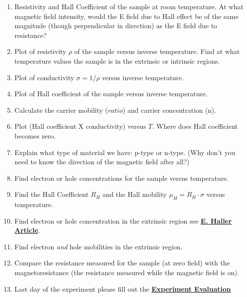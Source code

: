 \documentclass{../lab}
\begin{document}
\begin{enumerate}

    \item Resistivity and Hall Coefficient of the sample at room temperature. At what magnetic field intensity, would the E field due to Hall effect be of the same magnitude (though perpendicular in direction) as the E field due to resistance?

    \item Plot of resistivity $\rho$ of the sample versus inverse temperature. Find at what temperature values the sample is in the extrinsic or intrinsic regions.

    \item Plot of conductivity $\sigma = 1/\rho$ versus inverse temperature.

    \item Plot of Hall coefficient of the sample versus inverse temperature.

    \item Calculate the carrier mobility ($ratio$) and carrier concentration (n).

    \item Plot (Hall coefficient X conductivity) versus $T$. Where does Hall coefficient becomes zero.

    \item Explain what type of material we have: p-type or n-type. (Why don't you need to know the direction of the magnetic field after all?)

    \item Find electron or hole concentrations for the sample versus temperature.\\
    
    \item Find the Hall Coefficient $ R_H $ and the Hall mobility $\mu_H = R_H \cdot \sigma$ versus temperature.

    \item Find electron or hole concentration in the extrinsic region see \href{https://drive.google.com/file/d/1aaxKBCAtrejprBYuUYWViohH6TsHiIo8/view?usp=drive_link}{\textbf{E. Haller Article}}.

    \item Find electron \emph{and} hole mobilities in the extrinsic region.

    \item Compare the resistance measured for the sample (at zero field) with the magnetoresistance (the resistance measured while the magnetic field is on).

    \item Last day of the experiment please fill out the \href{\ExperimentEvaluation}{\textbf{Experiment Evaluation}}

\end{enumerate}
\end{document}
